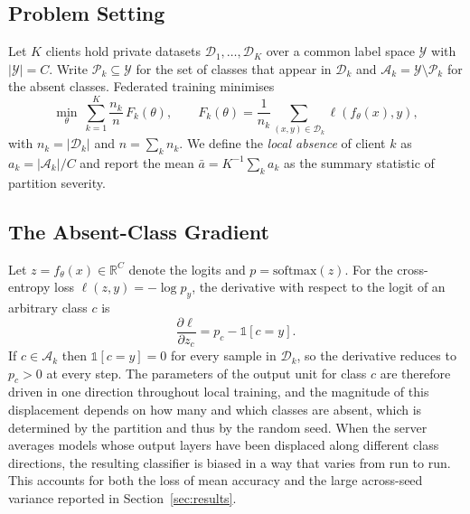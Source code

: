 \documentclass[journal]{IEEEtran}
\begin{document}
\subsection{Problem Setting}
Let $K$ clients hold private datasets $\mathcal{D}_1,\dots,\mathcal{D}_K$ over a
common label space $\mathcal{Y}$ with $|\mathcal{Y}| = C$. Write
$\mathcal{P}_k \subseteq \mathcal{Y}$ for the set of classes that appear in
$\mathcal{D}_k$ and $\mathcal{A}_k = \mathcal{Y} \setminus \mathcal{P}_k$ for the
absent classes. Federated training minimises
\begin{equation}
\min_{\theta}\ \sum_{k=1}^{K} \frac{n_k}{n}\, F_k(\theta),
\qquad
F_k(\theta) = \frac{1}{n_k}\sum_{(x,y)\in\mathcal{D}_k} \ell(f_\theta(x), y),
\label{eq:objective}
\end{equation}
with $n_k = |\mathcal{D}_k|$ and $n = \sum_k n_k$. We define the \emph{local
absence} of client $k$ as $a_k = |\mathcal{A}_k| / C$ and report the mean
$\bar{a} = K^{-1}\sum_k a_k$ as the summary statistic of partition severity.

\subsection{The Absent-Class Gradient}
\label{sec:absentgrad}
Let $z = f_\theta(x) \in \mathbb{R}^C$ denote the logits and $p =
\mathrm{softmax}(z)$. For the cross-entropy loss $\ell(z,y) = -\log p_y$, the
derivative with respect to the logit of an arbitrary class $c$ is
\begin{equation}
\frac{\partial \ell}{\partial z_c} = p_c - \mathbb{1}[c = y].
\label{eq:grad}
\end{equation}
If $c \in \mathcal{A}_k$ then $\mathbb{1}[c=y] = 0$ for every sample in
$\mathcal{D}_k$, so the derivative reduces to $p_c > 0$ at every step. The
parameters of the output unit for class $c$ are therefore driven in one
direction throughout local training, and the magnitude of this displacement
depends on how many and which classes are absent, which is determined by the
partition and thus by the random seed. When the server averages models whose
output layers have been displaced along different class directions, the
resulting classifier is biased in a way that varies from run to run. This
accounts for both the loss of mean accuracy and the large across-seed variance
reported in Section~\ref{sec:results}.
\end{document}
